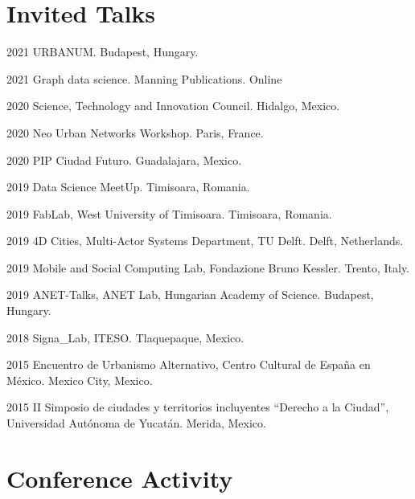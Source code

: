 \documentclass{academiccv}
\begin{document}
\section*{Invited Talks}
\begin{tablist}
	\item[2021] \tab URBANUM. Budapest, Hungary.
	\item[2021] \tab Graph data science. Manning Publications. Online
	\item[2020] \tab Science, Technology and Innovation Council. Hidalgo, Mexico.
	\item[2020] \tab Neo Urban Networks Workshop. Paris, France.
	\item[2020] \tab PIP Ciudad Futuro. Guadalajara, Mexico.
	\item[2019] \tab Data Science MeetUp. Timisoara, Romania.
	\item[2019] \tab FabLab, West University of Timisoara. Timisoara, Romania.
	\item[2019] \tab 4D Cities, Multi-Actor Systems Department, TU Delft. Delft, Netherlands.
	\item[2019] \tab Mobile and Social Computing Lab, Fondazione Bruno Kessler. Trento, Italy.
	\item[2019] \tab ANET-Talks, ANET Lab, Hungarian Academy of Science. Budapest, Hungary.
	\item[2018] \tab Signa\_Lab, ITESO. Tlaquepaque, Mexico.
	\item[2015] \tab Encuentro de Urbanismo Alternativo, Centro Cultural de España en México. Mexico City, Mexico.
	\item[2015] \tab II Simposio de ciudades y territorios incluyentes \enquote{Derecho a la Ciudad}, Universidad Autónoma de Yucatán. Merida, Mexico.
\end{tablist}

\section*{Conference Activity}
\end{document}

